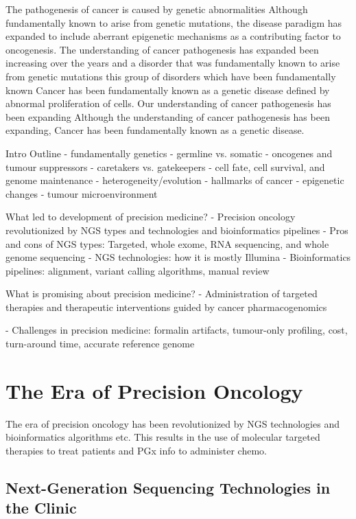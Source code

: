 The pathogenesis of cancer is caused by genetic abnormalities
Although fundamentally known to arise from genetic mutations, the disease paradigm has expanded to include aberrant epigenetic mechanisms as a contributing factor to oncogenesis.
The understanding of cancer pathogenesis has expanded been increasing over the years and a disorder that was fundamentally known to arise from genetic mutations this group of disorders which have been fundamentally known Cancer has been fundamentally known as a genetic disease defined by abnormal proliferation of cells.
Our understanding of cancer pathogenesis has been expanding  Although the understanding of cancer pathogenesis has been expanding, Cancer has been fundamentally known as a genetic disease.

Intro Outline
- fundamentally genetics
- germline vs. somatic
- oncogenes and tumour suppressors
- caretakers vs. gatekeepers
- cell fate, cell survival, and genome maintenance
- heterogeneity/evolution
- hallmarks of cancer
- epigenetic changes
- tumour microenvironment

What led to development of precision medicine?
- Precision oncology revolutionized by NGS types and technologies and bioinformatics pipelines
- Pros and cons of NGS types: Targeted, whole exome, RNA sequencing, and whole genome sequencing
- NGS technologies: how it is mostly Illumina
- Bioinformatics pipelines: alignment, variant calling algorithms, manual review

What is promising about precision medicine?
- Administration of targeted therapies and therapeutic interventions guided by cancer pharmacogenomics

- Challenges in precision medicine: formalin artifacts, tumour-only profiling, cost, turn-around time, accurate reference genome

\section{The Era of Precision Oncology}
\label{sec:TheEraofPrecisionOncology}

The era of precision oncology has been revolutionized by NGS technologies and bioinformatics algorithms etc. This results in the use of molecular targeted therapies to treat patients and PGx info to administer chemo.

\subsection{Next-Generation Sequencing Technologies in the Clinic}

